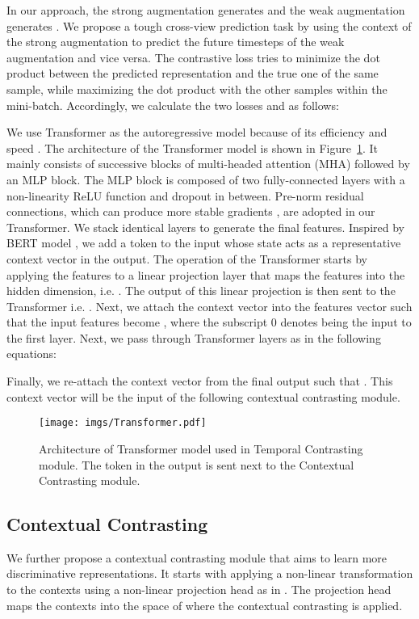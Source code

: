 \documentclass{article}
\begin{document}
In our approach, the strong augmentation generates  and the weak augmentation generates . We propose a tough cross-view prediction task by using the context of the strong augmentation  to predict the future timesteps of the weak augmentation  and vice versa. The contrastive loss tries to minimize the dot product between the predicted representation and the true one of the same sample, while maximizing the dot product with the other samples  within the mini-batch.
Accordingly, we calculate the two losses  and  as follows:



We use Transformer as the autoregressive model because of its efficiency and speed \cite{NIPS2017_3f5ee243}. The architecture of the Transformer model is shown in Figure~\ref{Fig:transformer}. It mainly consists of successive blocks of multi-headed attention (MHA) followed by an MLP block. The MLP block is composed of two fully-connected layers with a non-linearity ReLU function and dropout in between. Pre-norm residual connections, which can produce more stable gradients \cite{wang_learning}, are adopted in our Transformer. We stack  identical layers to generate the final features. Inspired by BERT model \cite{devlin2018bert}, we add a token  to the input whose state acts as a representative context vector in the output. 
The operation of the Transformer starts by applying the features  to a linear projection  layer that maps the features into the hidden dimension, i.e. . The output of this linear projection is then sent to the Transformer i.e. .
Next, we attach the context vector into the features vector  such that the input features become , where the subscript 0 denotes being the input to the first layer.
Next, we pass  through Transformer layers as in the following equations:

Finally, we re-attach the context vector from the final output such that .
This context vector will be the input of the following contextual contrasting module.

\begin{figure}
\centering
\texttt{[image: imgs/Transformer.pdf]}
\caption{Architecture of Transformer model used in Temporal Contrasting module. The token  in the output is sent next to the Contextual Contrasting module.}
\label{Fig:transformer}
\end{figure}



\subsection{Contextual Contrasting}
We further propose a contextual contrasting module that aims to learn more discriminative representations. It starts with applying a non-linear transformation to the contexts using a non-linear projection head as in \cite{chen2020simple}. The projection head maps the contexts into the space of where the contextual contrasting is applied. 
\end{document}
